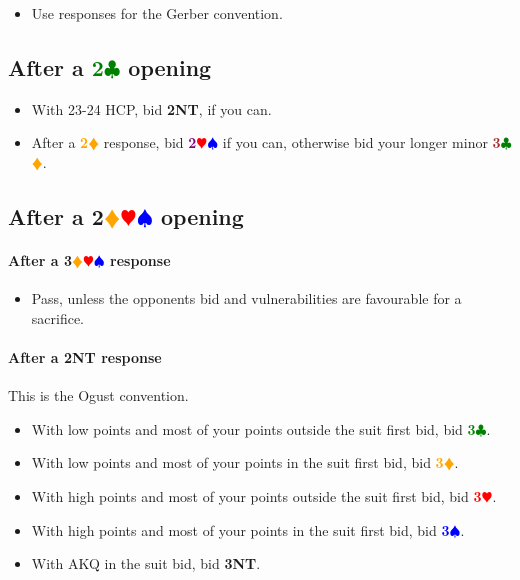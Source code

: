 \documentclass{article}
\newcommand{\Hs}{\textcolor{Red}{$\varheart$}}
\newcommand{\Ss}{\textcolor{Blue}{$\spadesuit$}}
\newcommand{\Ds}{\textcolor{Orange}{$\vardiamond$}}
\newcommand{\Cs}{\textcolor{Green}{$\clubsuit$}}
\newcommand{\NTs}{\textbf{\footnotesize{NT}}}
\renewcommand{\H}[1]{\textcolor{Red}{\textbf{#1}\Hs}}
\renewcommand{\S}[1]{\textcolor{Blue}{\textbf{#1}\Ss}}
\newcommand{\D}[1]{\textcolor{Orange}{\textbf{#1}\Ds}}
\newcommand{\C}[1]{\textcolor{Green}{\textbf{#1}\Cs}}
\newcommand{\NT}[1]{\textbf{#1\NTs}}
\newcommand{\minors}[1]{\textcolor{Brown}{\textbf{#1}}\Cs\Ds}
\newcommand{\majors}[1]{\textcolor{Purple}{\textbf{#1}}\Hs\Ss}
\newcommand{\notclubs}[1]{\textbf{#1}\Ds\Hs\Ss}
\begin{document}
\begin{itemize}
\item Use responses for the Gerber convention.
\end{itemize}

\subsection{After a \C{2} opening}

\begin{itemize}
\item With 23-24 HCP, bid \NT{2}, if you can.
\item After a \D{2} response, bid \majors{2} if you can, otherwise bid your longer minor \minors{3}.
\end{itemize}

\subsection{After a \notclubs{2} opening}

\paragraph{After a \notclubs{3} response}
\begin{itemize}
\item Pass, unless the opponents bid and vulnerabilities are favourable for a sacrifice.
\end{itemize}

\paragraph{After a \NT{2} response}

This is the Ogust convention.

\begin{itemize}
\item With low points and most of your points outside the suit first bid, bid \C{3}.
\item With low points and most of your points in the suit first bid, bid \D{3}.
\item With high points and most of your points outside the suit first bid, bid \H{3}.
\item With high points and most of your points in the suit first bid, bid \S{3}.
\item With AKQ in the suit bid, bid \NT{3}.
\end{itemize}
\end{document}
